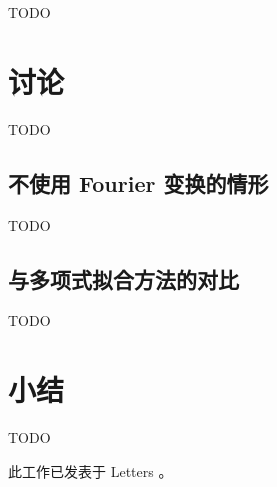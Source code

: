 TODO


\section{讨论}

TODO

\subsection{不使用 Fourier 变换的情形}

TODO

\subsection{与多项式拟合方法的对比}

TODO


\section{小结}

TODO

此工作已发表于 \mnras{} Letters \cite{li2018cdae}。


